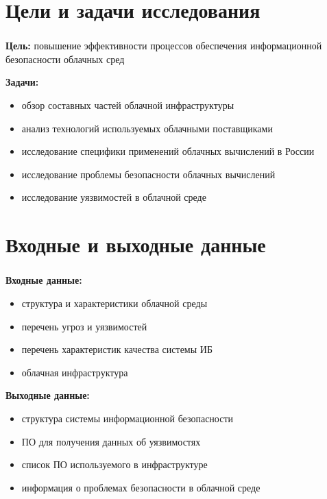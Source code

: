 
\frame[plain]{\titlepage} %


\section{Цели и задачи исследования}

\begin{frame}
\frametitle{\insertsection}

\textbf{Цель:} повышение эффективности процессов обеспечения информационной безопасности облачных сред

\vspace{\baselineskip}

\textbf{Задачи:}
\begin{itemize}
    \item обзор составных частей облачной инфраструктуры
    \item анализ технологий используемых облачными поставщиками
    \item исследование специфики применений облачных вычислений в России
    \item исследование проблемы безопасности облачных вычислений
    \item исследование уязвимостей в облачной среде
\end{itemize}
\end{frame}


\section{Входные и выходные данные}

\begin{frame}
\frametitle{\insertsection}

\textbf{Входные данные:}
\begin{itemize}
    \item структура и характеристики облачной среды
    \item перечень угроз и уязвимостей
    \item перечень характеристик качества системы ИБ
    \item облачная инфраструктура
\end{itemize}

\vspace{\baselineskip}

\textbf{Выходные данные:}
\begin{itemize}
    \item структура системы информационной безопасности
    \item ПО для получения данных об уязвимостях
    \item список ПО используемого в инфраструктуре
    \item информация о проблемах безопасности в облачной среде
\end{itemize}
\end{frame}


